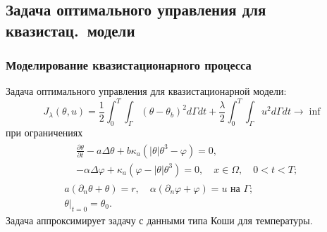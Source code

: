 \subsection{Задача оптимального управления для квазистац.\ модели}\label{quasi-solve}
\begin{frame}
    \frametitle{Моделирование квазистационарного процесса}
    Задача оптимального управления для квазистационарной модели:
    \begin{equation*}
        J_{\lambda}(\theta, u)=\frac{1}{2} \int_{0}^{T}
        \int_{\Gamma}\left(\theta-\theta_{b}\right)^{2} d \Gamma d t+\frac{\lambda}{2}
        \int_{0}^{T} \int_{\Gamma} u^{2} d \Gamma d t \rightarrow \inf
    \end{equation*}
    при ограничениях
    \begin{gather*}
        \begin{split}
            & \frac{\partial \theta}{\partial t} - a \Delta \theta
            + b \kappa_{a} \left(|\theta| \theta^{3}-\varphi\right) = 0,\\
            & - \alpha \Delta \varphi
            + \kappa_{a} \left(\varphi-|\theta| \theta^{3}\right) = 0,
            \quad x \in \Omega, \quad 0 < t < T;
        \end{split}\\
        a \left(\partial_{n} \theta+\theta\right)=r,
        \quad \alpha\left(\partial_{n} \varphi
        + \varphi\right) = u \text { на } \Gamma;\\
        \left.\theta\right|_{t=0} = \theta_{0}.
    \end{gather*}
    Задача аппроксимирует задачу с данными типа Коши для температуры.
\end{frame}

